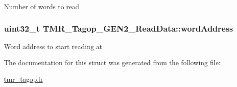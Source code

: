 Number of words to read \hypertarget{struct_t_m_r___tagop___g_e_n2___read_data_3bbe4d1e5d578e7a489048221a0b1ead}{
\subsubsection[{wordAddress}]{\setlength{\rightskip}{0pt plus 5cm}uint32\_\-t {\bf TMR\_\-Tagop\_\-GEN2\_\-ReadData::wordAddress}}}
\label{struct_t_m_r___tagop___g_e_n2___read_data_3bbe4d1e5d578e7a489048221a0b1ead}


Word address to start reading at 

The documentation for this struct was generated from the following file:\begin{CompactItemize}
\item 
\hyperlink{tmr__tagop_8h}{tmr\_\-tagop.h}\end{CompactItemize}
